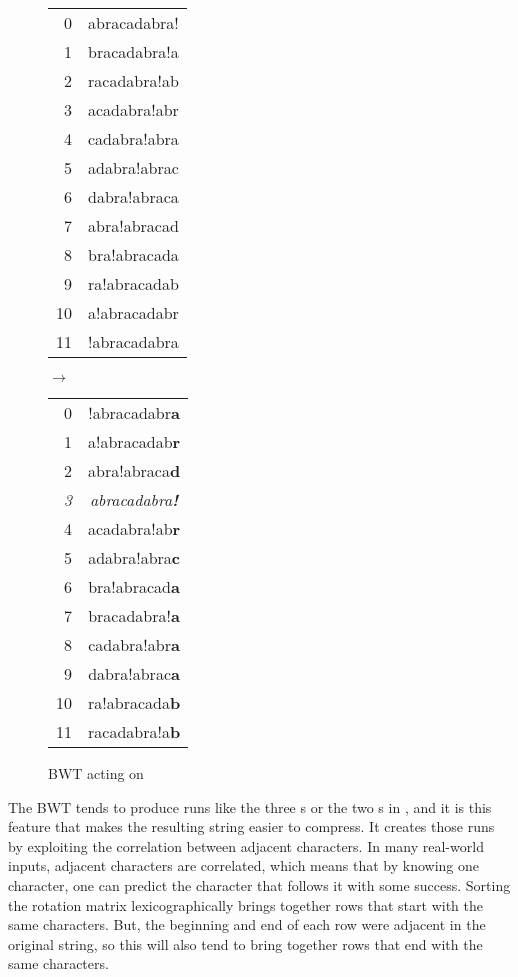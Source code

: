 \documentclass[sigplan,10pt,anonymous,review]{thesis}
\begin{document}
\begin{figure}
  \centering
  \begin{tt}
  \begin{tabular}{rc}
    0  & abracadabra! \\
    1  & bracadabra!a \\
    2  & racadabra!ab \\
    3  & acadabra!abr \\
    4  & cadabra!abra \\
    5  & adabra!abrac \\
    6  & dabra!abraca \\
    7  & abra!abracad \\
    8  & bra!abracada \\
    9  & ra!abracadab \\
    10 & a!abracadabr \\
    11 & !abracadabra
  \end{tabular}
  $\rightarrow$
  \begin{tabular}{rc}
    0  & !abracadabr\textbf{a} \\
    1  & a!abracadab\textbf{r} \\
    2  & abra!abraca\textbf{d} \\
    \textit{3} & \textit{abracadabra\textbf{!}} \\
    4  & acadabra!ab\textbf{r} \\
    5  & adabra!abra\textbf{c} \\
    6  & bra!abracad\textbf{a} \\
    7  & bracadabra!\textbf{a} \\
    8  & cadabra!abr\textbf{a} \\
    9  & dabra!abrac\textbf{a} \\
    10 & ra!abracada\textbf{b} \\
    11 & racadabra!a\textbf{b}
  \end{tabular}
  \end{tt}
  \caption{BWT acting on }
  \label{fig:bw_ex}
\end{figure}

The BWT tends to produce runs like the three s or the two
s in , and it is this feature that makes the
resulting string easier to compress. It creates those runs by
exploiting the correlation between adjacent characters. In many
real-world inputs, adjacent characters are correlated, which means
that by knowing one character, one can predict the character that
follows it with some success. Sorting the rotation matrix
lexicographically brings together rows that start with the same
characters. But, the beginning and end of each row were adjacent in
the original string, so this will also tend to bring together rows
that end with the same characters.
\end{document}
